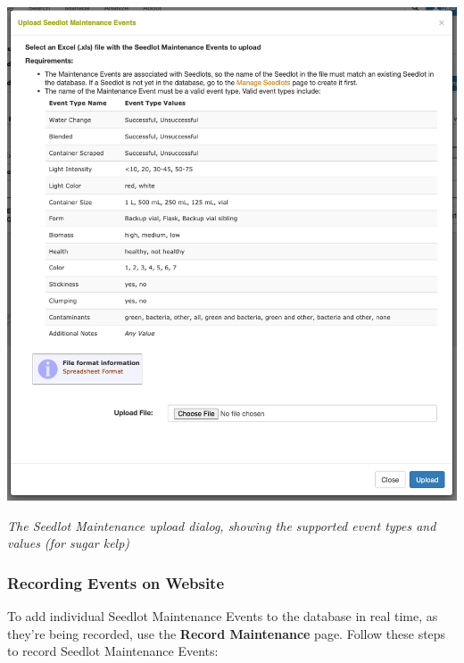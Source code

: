 \documentclass[
  12pt,
]{book}
\begin{document}
\begin{center}\includegraphics[width=0.95\linewidth]{assets/images/seedlot_maintenance_upload} \end{center}

\emph{The Seedlot Maintenance upload dialog, showing the supported event types and values (for sugar kelp)}

\hypertarget{recording-events-on-website}{%
\subsubsection*{Recording Events on Website}\label{recording-events-on-website}}


To add individual Seedlot Maintenance Events to the database in real time, as they're being recorded, use the \textbf{Record Maintenance} page. Follow these steps to record Seedlot Maintenance Events:
\end{document}
